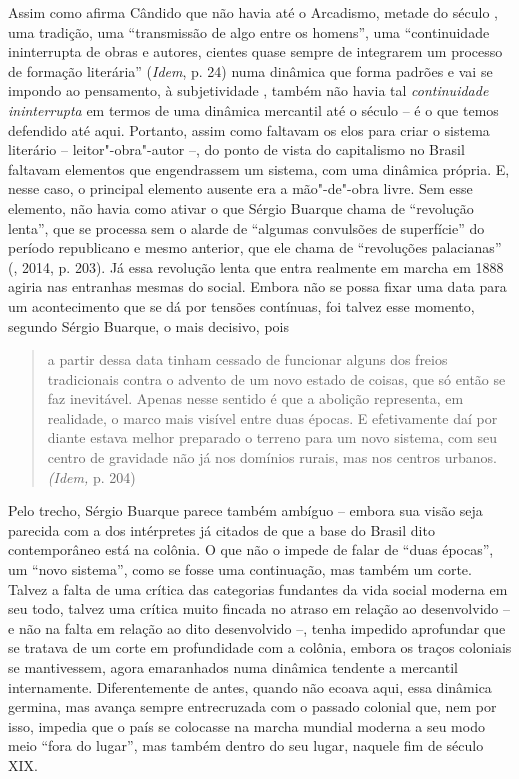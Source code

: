 Assim como afirma Cândido que não havia até o Arcadismo, metade do
século , uma tradição, uma ``transmissão de algo entre os homens'',
uma ``continuidade ininterrupta de obras e autores, cientes quase sempre
de integrarem um processo de formação literária'' (\emph{Idem}, p. 24)
numa dinâmica que forma padrões e vai se impondo ao pensamento, à
subjetividade , também não havia tal \emph{continuidade ininterrupta} em
termos de uma dinâmica mercantil até o século  -- é o que temos
defendido até aqui. Portanto, assim como faltavam os elos para criar o
sistema literário -- leitor"-obra"-autor --, do ponto de vista do
capitalismo no Brasil faltavam elementos que engendrassem um sistema,
com uma dinâmica própria. E, nesse caso, o principal elemento ausente
era a mão"-de"-obra livre. Sem esse elemento, não havia como ativar o que
Sérgio Buarque chama de ``revolução lenta'', que se processa sem o
alarde de ``algumas convulsões de superfície'' do período republicano e
mesmo anterior, que ele chama de ``revoluções palacianas'' (,
2014, p. 203). Já essa revolução lenta que entra realmente em marcha em
1888 agiria nas entranhas mesmas do social. Embora não se possa fixar
uma data para um acontecimento que se dá por tensões contínuas, foi
talvez esse momento, segundo Sérgio Buarque, o mais decisivo, pois

\begin{quote}
a partir dessa data tinham cessado de funcionar alguns dos freios
tradicionais contra o advento de um novo estado de coisas, que só então
se faz inevitável. Apenas nesse sentido é que a abolição representa, em
realidade, o marco mais visível entre duas épocas. E efetivamente daí
por diante estava melhor preparado o terreno para um novo sistema, com
seu centro de gravidade não já nos domínios rurais, mas nos centros
urbanos. \emph{(Idem,} p. 204)
\end{quote}

Pelo trecho, Sérgio Buarque parece também ambíguo -- embora sua visão
seja parecida com a dos intérpretes já citados de que a base do Brasil
dito contemporâneo está na colônia. O que não o impede de falar de
``duas épocas'', um ``novo sistema'', como se fosse uma continuação, mas
também um corte. Talvez a falta de uma crítica das categorias fundantes
da vida social moderna em seu todo, talvez uma crítica muito fincada no
atraso em relação ao desenvolvido -- e não na falta em relação ao dito
desenvolvido --, tenha impedido aprofundar que se tratava de um corte em
profundidade com a colônia, embora os traços coloniais se mantivessem,
agora emaranhados numa dinâmica tendente a mercantil internamente.
Diferentemente de antes, quando não ecoava aqui, essa dinâmica germina,
mas avança sempre entrecruzada com o passado colonial que, nem por isso,
impedia que o país se colocasse na marcha mundial moderna a seu modo
meio ``fora do lugar'', mas também dentro do seu lugar, naquele fim de
século XIX.

